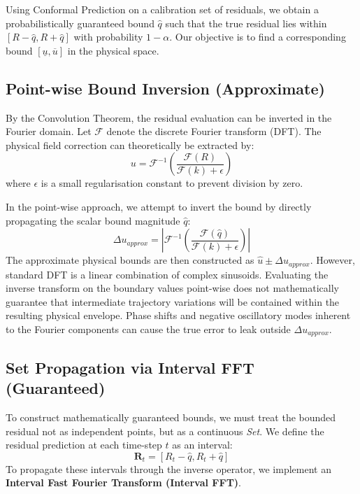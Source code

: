 \documentclass{article}
\begin{document}
Using Conformal Prediction on a calibration set of residuals, we obtain a probabilistically guaranteed bound $\hat{q}$ such that the true residual lies within $[R - \hat{q}, R + \hat{q}]$ with probability $1 - \alpha$. Our objective is to find a corresponding bound $[\underline{u}, \overline{u}]$ in the physical space.

\subsection{Point-wise Bound Inversion (Approximate)}
By the Convolution Theorem, the residual evaluation can be inverted in the Fourier domain. Let $\mathcal{F}$ denote the discrete Fourier transform (DFT). The physical field correction can theoretically be extracted by:
\begin{equation}
    u = \mathcal{F}^{-1}\left( \frac{\mathcal{F}(R)}{\mathcal{F}(k) + \epsilon} \right)
\end{equation}
where $\epsilon$ is a small regularisation constant to prevent division by zero.

In the point-wise approach, we attempt to invert the bound by directly propagating the scalar bound magnitude $\hat{q}$:
\begin{equation}
    \Delta u_{approx} = \left| \mathcal{F}^{-1}\left( \frac{\mathcal{F}(\hat{q})}{\mathcal{F}(k) + \epsilon} \right) \right|
\end{equation}
The approximate physical bounds are then constructed as $\hat{u} \pm \Delta u_{approx}$. However, standard DFT is a linear combination of complex sinusoids. Evaluating the inverse transform on the boundary values point-wise does not mathematically guarantee that intermediate trajectory variations will be contained within the resulting physical envelope. Phase shifts and negative oscillatory modes inherent to the Fourier components can cause the true error to leak outside $\Delta u_{approx}$.

\subsection{Set Propagation via Interval FFT (Guaranteed)}
To construct mathematically guaranteed bounds, we must treat the bounded residual not as independent points, but as a continuous \textit{Set}. We define the residual prediction at each time-step $t$ as an interval:
\begin{equation}
    \mathbf{R}_t = [R_t - \hat{q}, R_t + \hat{q}]
\end{equation}
To propagate these intervals through the inverse operator, we implement an \textbf{Interval Fast Fourier Transform (Interval FFT)}.
\end{document}
